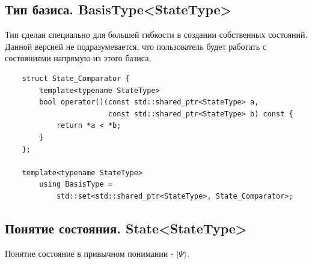 \documentclass[12pt,fleqn]{article}
\begin{document}
        \subsection{Тип базиса. \textbf{BasisType<StateType>}}

        Тип сделан специально для большей гибкости в создании собственных состояний. Данной версией не подразумевается, что пользователь будет работать с состояниями напрямую из этого базиса.

\begin{mdframed}[linecolor=black, topline=true, bottomline=true,
    leftline=false, rightline=false]
\begin{verbatim}
    struct State_Comparator {
        template<typename StateType>
        bool operator()(const std::shared_ptr<StateType> a,
                        const std::shared_ptr<StateType> b) const {
            return *a < *b;
        }
    };

    template<typename StateType>
        using BasisType = 
            std::set<std::shared_ptr<StateType>, State_Comparator>;
\end{verbatim}
\end{mdframed}

    \subsection{Понятие состояния. \textbf{State<StateType>}}

    Понятие состояние в привычном понимании - $|\Psi\rangle$.
\end{document}
